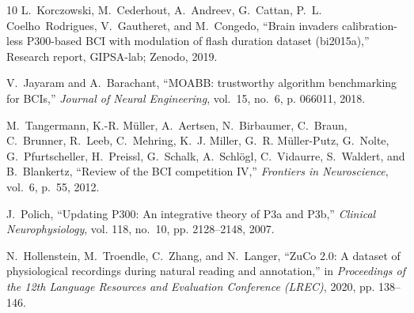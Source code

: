\documentclass[conference]{IEEEtran}
\begin{document}
\begin{thebibliography}{10}
L.~Korczowski, M.~Cederhout, A.~Andreev, G.~Cattan, P.~L. Coelho~Rodrigues,
  V.~Gautheret, and M.~Congedo, ``Brain invaders calibration-less {P300}-based
  {BCI} with modulation of flash duration dataset (bi2015a),'' Research report,
  GIPSA-lab; Zenodo, 2019.

V.~Jayaram and A.~Barachant, ``{MOABB}: trustworthy algorithm benchmarking for
  {BCIs},'' \emph{Journal of Neural Engineering}, vol.~15, no.~6, p. 066011,
  2018.

M.~Tangermann, K.-R. M{\"u}ller, A.~Aertsen, N.~Birbaumer, C.~Braun,
  C.~Brunner, R.~Leeb, C.~Mehring, K.~J. Miller, G.~R. M{\"u}ller-Putz,
  G.~Nolte, G.~Pfurtscheller, H.~Preissl, G.~Schalk, A.~Schl{\"o}gl,
  C.~Vidaurre, S.~Waldert, and B.~Blankertz, ``Review of the {BCI} competition
  {IV},'' \emph{Frontiers in Neuroscience}, vol.~6, p.~55, 2012.

J.~Polich, ``Updating {P300}: An integrative theory of {P3a} and {P3b},''
  \emph{Clinical Neurophysiology}, vol. 118, no.~10, pp. 2128--2148, 2007.

N.~Hollenstein, M.~Troendle, C.~Zhang, and N.~Langer, ``{ZuCo 2.0}: A dataset
  of physiological recordings during natural reading and annotation,'' in
  \emph{Proceedings of the 12th Language Resources and Evaluation Conference
  (LREC)}, 2020, pp. 138--146.

\end{thebibliography}
\end{document}
